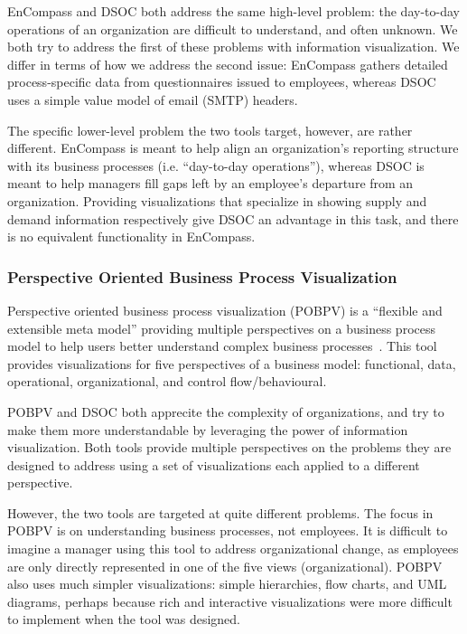 \documentclass[journal]{vgtc}                %
\begin{document}
EnCompass and DSOC both address the same high-level problem: the day-to-day operations of an organization are difficult to understand, and often unknown. We both try to address the first of these problems with information visualization. We differ in terms of how we address the second issue: EnCompass gathers detailed process-specific data from questionnaires issued to employees, whereas DSOC uses a simple value model of email (SMTP) headers.

The specific lower-level problem the two tools target, however, are rather different. EnCompass is meant to help align an organization's reporting structure with its business processes (i.e. ``day-to-day operations''), whereas DSOC is meant to help managers fill gaps left by an employee's departure from an organization. Providing visualizations that specialize in showing supply and demand information respectively give DSOC an advantage in this task, and there is no equivalent functionality in EnCompass.

\subsubsection{Perspective Oriented Business Process Visualization}
\label{sec:pobpv}

Perspective oriented business process visualization (POBPV) is a ``flexible and extensible meta model'' providing multiple perspectives on a business process model to help users better understand complex business processes~\cite{jablonski2007perspective}. This tool provides visualizations for five perspectives of a business model: functional, data, operational, organizational, and control flow/behavioural. 

POBPV and DSOC both apprecite the complexity of organizations, and try to make them more understandable by leveraging the power of information visualization. Both tools provide multiple perspectives on the problems they are designed to address using a set of visualizations each applied to a different perspective.

However, the two tools are targeted at quite different problems. The focus in POBPV is on understanding business processes, not employees. It is difficult to imagine a manager using this tool to address organizational change, as employees are only directly represented in one of the five views (organizational). POBPV also uses much simpler visualizations: simple hierarchies, flow charts, and UML diagrams, perhaps because rich and interactive visualizations were more difficult to implement when the tool was designed. 
\end{document}
